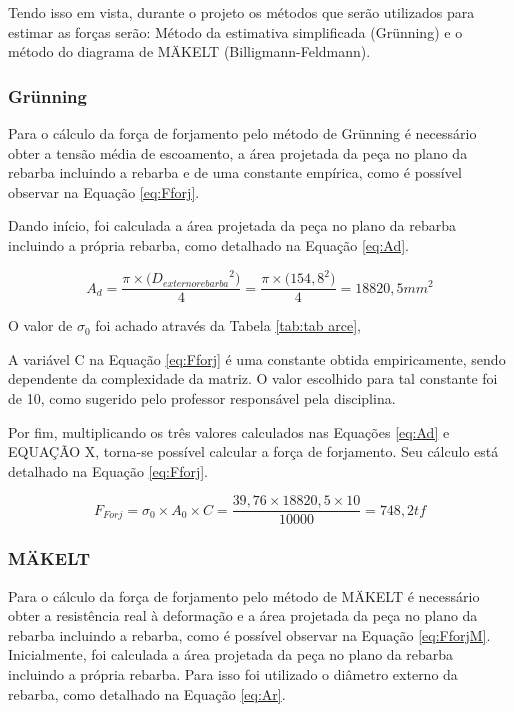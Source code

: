 \documentclass[deposito, acronym, symbols]{fei}
\begin{document}
Tendo isso em vista, durante o projeto os métodos que serão utilizados para estimar as forças serão: Método da estimativa simplificada (Grünning) e  o método do diagrama de MÄKELT (Billigmann-Feldmann).

\subsubsection{Grünning} 

Para o cálculo da força de forjamento pelo método de Grünning é necessário obter a tensão média de escoamento, a área projetada da peça no plano da rebarba incluindo a rebarba e de uma constante empírica, como é possível observar na Equação \ref{eq:Fforj}.

 Dando início, foi calculada a área projetada da peça no plano da rebarba incluindo a própria rebarba, como detalhado na Equação \ref{eq:Ad}.

\begin{equation}
    \label{eq:Ad} 
    A_{d}= \frac{\pi\times({{D_{externo rebarba}}^{2})}}{4} = \frac{\pi\times({{154,8}^{2})}}{4} = 18820,5 mm^2
\end{equation} 

O valor de $\sigma_0$ foi achado através da Tabela \ref{tab:tab arce}, 

A variável C na Equação \ref{eq:Fforj} é uma constante obtida empiricamente, sendo dependente da complexidade da matriz. O valor escolhido para tal constante foi de 10, como sugerido pelo professor responsável pela disciplina.

Por fim, multiplicando os três valores calculados nas Equações \ref{eq:Ad} e EQUAÇÃO X, torna-se possível calcular a força de forjamento. Seu cálculo está detalhado na Equação \ref{eq:Fforj}. 

\begin{equation}
    \label{eq:Fforj}
    F_{Forj}= \sigma_{0}\times A_{0} \times C= \frac{39,76\times18820,5\times10}{10000}=748,2tf
\end{equation} 

\subsubsection{MÄKELT}

Para o cálculo da força de forjamento pelo método de MÄKELT é necessário obter a resistência real à deformação e a área projetada da peça no plano da rebarba incluindo a rebarba, como é possível observar na Equação \ref{eq:FforjM}. Inicialmente, foi calculada a área projetada da peça no plano da rebarba incluindo a própria rebarba. Para isso foi utilizado o diâmetro externo da rebarba, como detalhado na Equação \ref{eq:Ar}.
\end{document}
